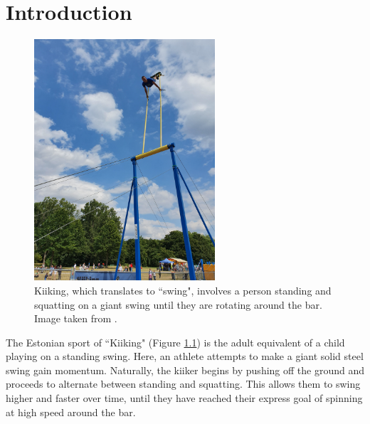 

\chapter{Introduction}

\begin{figure}[t]
    \centering
    \includegraphics[width=0.6\textwidth,angle=270]{images/kiiking.jpg}
    \caption{Kiiking, which translates to ``swing", involves a person standing
        and squatting on a giant swing until they are rotating around the bar.
    Image taken from \cite{kiiking-img}.}
    \label{fig:kiiking}
\end{figure}

The Estonian sport of ``Kiiking" (Figure \ref{fig:kiiking}) is the adult
equivalent of a child playing on a standing swing. 
Here, an athlete attempts to make a giant solid steel swing gain momentum.
Naturally, the kiiker begins by pushing off the ground and proceeds to alternate
between standing and squatting. 
This allows them to swing higher and faster over time, until they have reached
their express goal of spinning at high speed around the bar.

